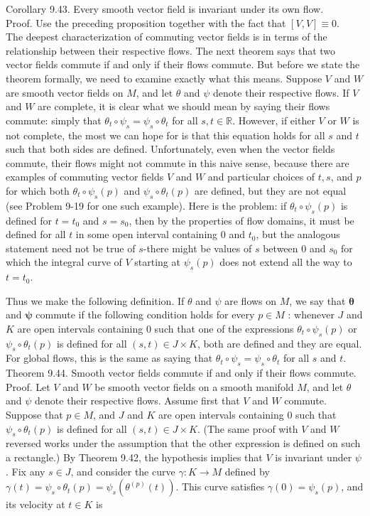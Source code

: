 \documentclass[10pt]{article}
\begin{document}
Corollary 9.43. Every smooth vector field is invariant under its own flow.\\
Proof. Use the preceding proposition together with the fact that $[V, V] \equiv 0$.\\
The deepest characterization of commuting vector fields is in terms of the relationship between their respective flows. The next theorem says that two vector fields commute if and only if their flows commute. But before we state the theorem formally, we need to examine exactly what this means. Suppose $V$ and $W$ are smooth vector fields on $M$, and let $\theta$ and $\psi$ denote their respective flows. If $V$ and $W$ are complete, it is clear what we should mean by saying their flows commute: simply that $\theta_{t} \circ \psi_{s}=\psi_{s} \circ \theta_{t}$ for all $s, t \in \mathbb{R}$. However, if either $V$ or $W$ is not complete, the most we can hope for is that this equation holds for all $s$ and $t$ such that both sides are defined. Unfortunately, even when the vector fields commute, their flows might not commute in this naive sense, because there are examples of commuting vector fields $V$ and $W$ and particular choices of $t, s$, and $p$ for which both $\theta_{t} \circ \psi_{s}(p)$ and $\psi_{s} \circ \theta_{t}(p)$ are defined, but they are not equal (see Problem 9-19 for one such example). Here is the problem: if $\theta_{t} \circ \psi_{s}(p)$ is defined for $t=t_{0}$ and $s=s_{0}$, then by the properties of flow domains, it must be defined for all $t$ in some open interval containing 0 and $t_{0}$, but the analogous statement need not be true of $s$-there might be values of $s$ between 0 and $s_{0}$ for which the integral curve of $V$ starting at $\psi_{s}(p)$ does not extend all the way to $t=t_{0}$.

Thus we make the following definition. If $\theta$ and $\psi$ are flows on $M$, we say that $\boldsymbol{\theta}$ and $\boldsymbol{\psi}$ commute if the following condition holds for every $p \in M$ : whenever $J$ and $K$ are open intervals containing 0 such that one of the expressions $\theta_{t} \circ \psi_{s}(p)$ or $\psi_{s} \circ \theta_{t}(p)$ is defined for all $(s, t) \in J \times K$, both are defined and they are equal. For global flows, this is the same as saying that $\theta_{t} \circ \psi_{s}=\psi_{s} \circ \theta_{t}$ for all $s$ and $t$.\\
Theorem 9.44. Smooth vector fields commute if and only if their flows commute.\\
Proof. Let $V$ and $W$ be smooth vector fields on a smooth manifold $M$, and let $\theta$ and $\psi$ denote their respective flows. Assume first that $V$ and $W$ commute. Suppose that $p \in M$, and $J$ and $K$ are open intervals containing 0 such that $\psi_{s} \circ \theta_{t}(p)$ is defined for all $(s, t) \in J \times K$. (The same proof with $V$ and $W$ reversed works under the assumption that the other expression is defined on such a rectangle.) By Theorem 9.42, the hypothesis implies that $V$ is invariant under $\psi$. Fix any $s \in J$, and consider the curve $\gamma: K \rightarrow M$ defined by $\gamma(t)=\psi_{s} \circ \theta_{t}(p)=\psi_{s}\left(\theta^{(p)}(t)\right)$. This curve satisfies $\gamma(0)=\psi_{s}(p)$, and its velocity at $t \in K$ is
\end{document}
